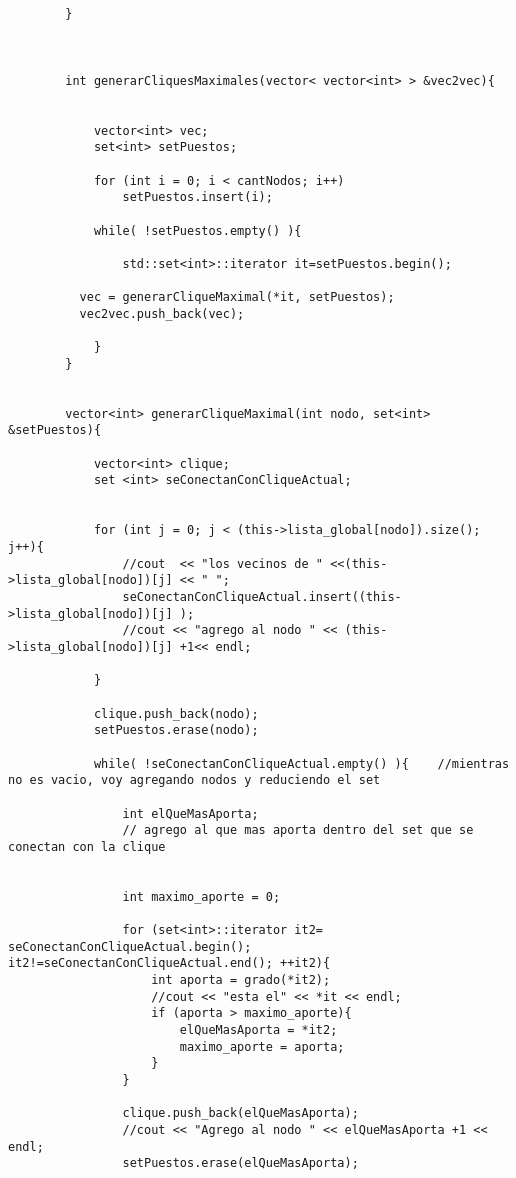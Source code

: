 \begin{lstlisting}
        }



        int generarCliquesMaximales(vector< vector<int> > &vec2vec){  


            vector<int> vec;
            set<int> setPuestos;

            for (int i = 0; i < cantNodos; i++)
                setPuestos.insert(i);

            while( !setPuestos.empty() ){

                std::set<int>::iterator it=setPuestos.begin();

          vec = generarCliqueMaximal(*it, setPuestos);
          vec2vec.push_back(vec);
      
            }
        }


        vector<int> generarCliqueMaximal(int nodo, set<int> &setPuestos){
      
            vector<int> clique;
            set <int> seConectanConCliqueActual;

      
            for (int j = 0; j < (this->lista_global[nodo]).size(); j++){
                //cout  << "los vecinos de " <<(this->lista_global[nodo])[j] << " ";
                seConectanConCliqueActual.insert((this->lista_global[nodo])[j] );
                //cout << "agrego al nodo " << (this->lista_global[nodo])[j] +1<< endl;
                
            }
      
            clique.push_back(nodo);
            setPuestos.erase(nodo);
            
            while( !seConectanConCliqueActual.empty() ){    //mientras no es vacio, voy agregando nodos y reduciendo el set

                int elQueMasAporta;
                // agrego al que mas aporta dentro del set que se conectan con la clique


                int maximo_aporte = 0;

                for (set<int>::iterator it2= seConectanConCliqueActual.begin(); it2!=seConectanConCliqueActual.end(); ++it2){       
                    int aporta = grado(*it2);
                    //cout << "esta el" << *it << endl;
                    if (aporta > maximo_aporte){
                        elQueMasAporta = *it2;
                        maximo_aporte = aporta;
                    }
                }

                clique.push_back(elQueMasAporta);
                //cout << "Agrego al nodo " << elQueMasAporta +1 << endl;
                setPuestos.erase(elQueMasAporta);
             

\end{lstlisting}
